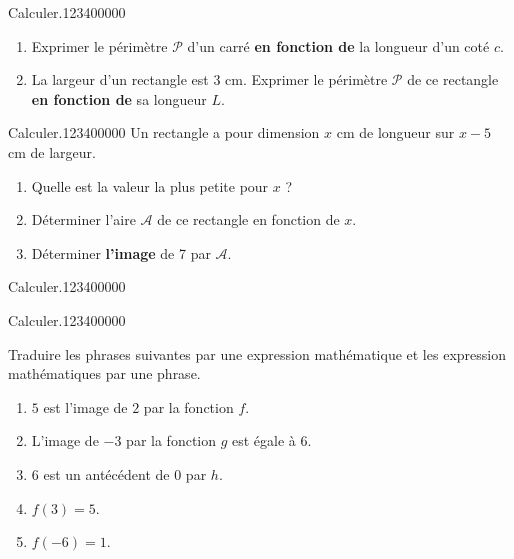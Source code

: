 \begin{pageAD} 
 

 
\begin{ExoCad}{Calculer.}{1234}{0}{0}{0}{0}{0}

\begin{enumerate}[leftmargin=*]
\item Exprimer le périmètre $\mathscr P$ d'un carré \textbf{en fonction de} la longueur d'un coté $c$. 
\item La largeur d'un rectangle est 3 cm. Exprimer le périmètre $\mathscr P$ de ce rectangle \textbf{en fonction de} sa longueur $L$.
\end{enumerate}
\end{ExoCad}

 

\begin{ExoCad}{Calculer.}{1234}{0}{0}{0}{0}{0}
Un rectangle a pour dimension $x$ cm de longueur sur $x-5$ cm de largeur. 
\begin{enumerate}[leftmargin=*]
\item Quelle est la valeur la plus petite pour $x$ ? 
\item Déterminer l'aire $\mathcal{A}$ de ce rectangle en fonction de $x$.  
\item Déterminer \textbf{l'image} de 7 par $\mathcal{A}$.  
\end{enumerate}
\end{ExoCad}

\begin{ExoCad}{Calculer.}{1234}{0}{0}{0}{0}{0}
 
\end{ExoCad}


\begin{ExoCad}{Calculer.}{1234}{0}{0}{0}{0}{0}

Traduire les phrases suivantes par une expression mathématique et les expression mathématiques par une phrase.

\begin{enumerate}[leftmargin=*]
\item $5$ est l'image de $2$ par la fonction $f$. 
\item L'image de $-3$ par la fonction $g$ est égale à $6$.
\item $6$ est un antécédent de $0$ par $h$. 
\item $f(3)=5$. 
\item $f(-6)=1$.
\end{enumerate}

\end{ExoCad}



\end{pageAD}


